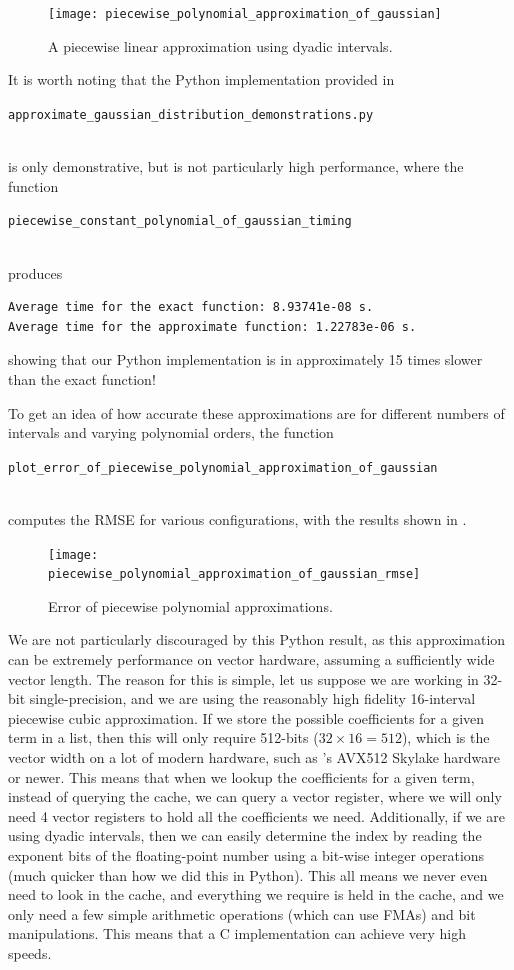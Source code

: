 \documentclass[11pt,a4paper,oneside,english]{extarticle}
\newcommand{\singlecodeline}[1]{\\[1em]\centerline{\lstinline[basicstyle=\ttfamily]$#1$}\\[1em]}
\begin{document}
\begin{figure}[htb]
\centering
\texttt{[image: piecewise\_polynomial\_approximation\_of\_gaussian]}
\caption{A piecewise linear approximation using dyadic intervals.}
\label{fig:piecewise_polynomial_approximation_of_gaussian}
\end{figure}

It is worth noting that the Python implementation provided in 
\singlecodeline{approximate_gaussian_distribution_demonstrations.py}
is only demonstrative, but is not particularly high performance, where the function \singlecodeline{piecewise_constant_polynomial_of_gaussian_timing}
produces
\begin{verbatim}
Average time for the exact function: 8.93741e-08 s.
Average time for the approximate function: 1.22783e-06 s.
\end{verbatim}
showing that our Python implementation is in approximately 15 times slower than the exact function! 

To get an idea of how accurate these approximations are for different numbers of intervals and varying polynomial orders, the function \singlecodeline{plot_error_of_piecewise_polynomial_approximation_of_gaussian} computes the RMSE for various configurations, with the results shown in .

\begin{figure}[htb]
\centering
\texttt{[image: piecewise\_polynomial\_approximation\_of\_gaussian\_rmse]}
\caption{Error of piecewise polynomial approximations.}
\label{fig:piecewise_polynomial_approximation_of_gaussian_rmse}
\end{figure}

We are not particularly discouraged by this Python result, as this approximation can be extremely performance on vector hardware, assuming a sufficiently wide vector length. The reason for this is simple, let us suppose we are working in 32-bit single-precision, and we are using the reasonably high fidelity 16-interval piecewise cubic approximation. If we store the possible coefficients for a given term in a list, then this will only require 512-bits ($ 32 \times 16 = 512 $), which is the vector width on a lot of modern hardware, such as \intel's AVX512 Skylake hardware or newer. This means that when we lookup the coefficients for a given term, instead of querying the cache, we can query a vector register, where we will only need 4 vector registers to hold all the coefficients we need. Additionally, if we are using dyadic intervals, then we can easily determine the index by reading the exponent bits of the floating-point number using a bit-wise integer operations (much quicker than how we did this in Python). This all means we never even need to look in the cache, and everything we require is held in the cache, and we only need a few simple arithmetic operations (which can use FMAs) and bit manipulations. This means that a C implementation can achieve very high speeds. 
\end{document}
